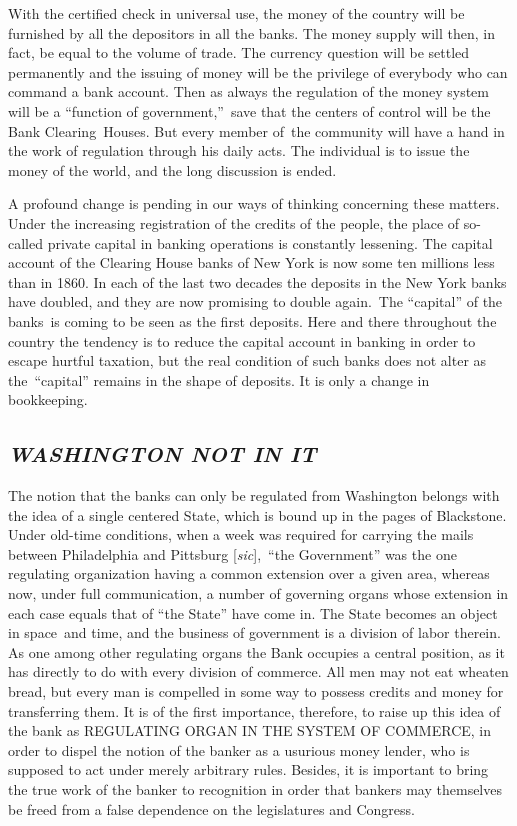 \documentclass[twoside,symmetric,nobib,justified]{tufte-book}
\begin{document}
With the certified check in universal use, the money of the country will
be furnished by all the depositors in all the banks. The money supply
will then, in fact, be equal to the volume of trade. The currency
question will be settled permanently and the issuing of money will be
the privilege of everybody who can command a bank account. Then as
always the regulation of the money system will be a ``function of
government,''~save that the centers of control will be the Bank
Clearing~Houses. But every member of~the community will have a hand in
the work of regulation through his daily acts. The individual is to
issue the money of the world, and the long discussion is ended.~

A profound change is pending in our ways of thinking concerning these
matters. Under the increasing registration of the credits of the people,
the place of so-called private capital in banking operations is
constantly lessening. The capital account of the Clearing House banks of
New York is now some ten millions less than in 1860. In each of the last
two decades the deposits in the New York banks have doubled, and they
are now promising to double again.~The ``capital'' of the banks~is
coming to be seen as the first deposits. Here and there throughout the
country the tendency is to reduce the capital account in banking in
order to escape hurtful taxation, but the real condition of such banks
does not alter as the~``capital'' remains in the shape of deposits. It
is only a change in bookkeeping.~

\hypertarget{washington-not-in-it}{%
\subsection{\texorpdfstring{\emph{WASHINGTON NOT IN
IT}}{WASHINGTON NOT IN IT}}\label{washington-not-in-it}}

The notion that the banks can only be regulated from Washington belongs
with the idea of a single centered State, which is bound up in the pages
of Blackstone. Under old-time conditions, when a week was required for
carrying the mails between Philadelphia and Pittsburg
{[}\emph{sic}{]},~``the Government'' was the one regulating organization
having a common extension over a given area, whereas now, under full
communication, a number of governing organs whose extension in each case
equals that of ``the State'' have come in. The State becomes an object
in space~and time, and the business of government is a division of labor
therein. As one among other regulating organs the Bank occupies a
central position, as it has directly to do with every division of
commerce. All men may not eat wheaten bread, but every man is compelled
in some way to possess credits and money for transferring them. It is of
the first importance, therefore, to raise up this idea of the bank as
REGULATING ORGAN IN THE SYSTEM OF COMMERCE, in order to dispel the
notion of the banker as a usurious money lender, who is supposed to act
under merely arbitrary rules. Besides, it is important to bring the true
work of the banker to recognition in order that bankers may themselves
be freed from a false dependence on the legislatures and Congress. ~
\end{document}
